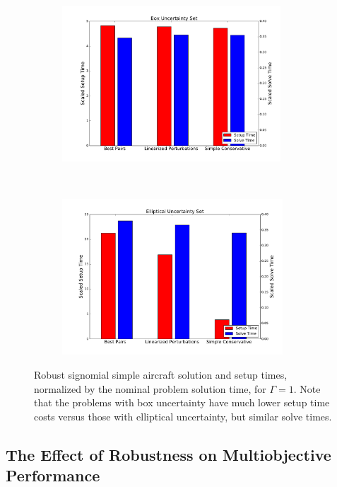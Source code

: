 \ \\
\begin{figure}[ht]
    \centering
    \captionsetup{justification=centering, font=small}
    \begin{subfigure}{0.49\textwidth}
        \centering
        \includegraphics[height=2.3in]{signomial_simple_flight/box_sst.pdf}
    \end{subfigure}
    ~
    \begin{subfigure}{0.49\textwidth}
        \centering
        \includegraphics[height=2.3in]{signomial_simple_flight/ell_sst.pdf}
    \end{subfigure}
    \caption{Robust signomial simple aircraft solution and setup times, normalized by the
    nominal problem solution time, for $\Gamma = 1$.
    Note that the problems with box uncertainty have much lower setup
    time costs versus those with elliptical uncertainty, but similar solve times.}
    \label{compare_signomial}
\end{figure}

\subsection{The Effect of Robustness on Multiobjective Performance}

